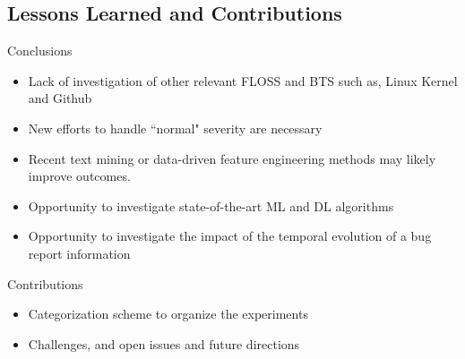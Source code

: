 \subsection{Lessons Learned and Contributions}
\begin{frame}[t,fragile]{Conclusions}
	\begin{itemize}
 \item Lack of investigation of other relevant FLOSS and BTS such as, \alert{Linux Kernel} and \alert{Github}
\item New efforts to handle \alert{``normal"} severity are necessary
\item Recent text mining or data-driven feature engineering methods may likely \alert{improve} outcomes.
\item Opportunity to investigate \alert{state-of-the-art} ML and DL algorithms
\item Opportunity to investigate the \alert{impact} of the temporal evolution of a bug report information
	\end{itemize}
\end{frame}

\begin{frame}[t,fragile]{Contributions}
	\begin{itemize}
		\item Categorization scheme to \alert{organize} the experiments 
		\item \alert{Challenges}, and \alert{open issues} and \alert{future directions}
	\end{itemize}
\end{frame}


